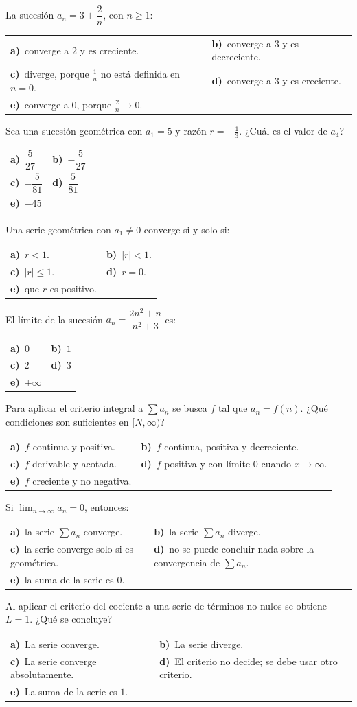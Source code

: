 \documentclass[11pt,letterpaper]{article}
\makeatletter
\newcommand{\opciones}[5]{%
  \par\vspace{2pt}%
  \noindent
  \begin{tabularx}{\linewidth}{@{}>{\raggedright\arraybackslash}X@{\hspace{14pt}}>{\raggedright\arraybackslash}X@{}}
    \textbf{a)}~#1 & \textbf{b)}~#2\\[3pt]
    \textbf{c)}~#3 & \textbf{d)}~#4\\[3pt]
    \textbf{e)}~#5 & \null
  \end{tabularx}\par\vspace{-2pt}}
\makeatother
\begin{document}
\begin{preguntas}
\item La sucesión $a_n=3+\dfrac{2}{n}$, con $n\ge 1$:
  \opciones{converge a $2$ y es creciente.}
           {converge a $3$ y es decreciente.}
           {diverge, porque $\frac{1}{n}$ no está definida en $n=0$.}
           {converge a $3$ y es creciente.}
           {converge a $0$, porque $\frac{2}{n}\to 0$.}

\item Sea una sucesión geométrica con $a_1=5$ y razón $r=-\frac{1}{3}$. ¿Cuál es el valor de $a_4$?
  \opciones{$\dfrac{5}{27}$}
           {$-\dfrac{5}{27}$}
           {$-\dfrac{5}{81}$}
           {$\dfrac{5}{81}$}
           {$-45$}

\item Una serie geométrica con $a_1\ne 0$ converge si y solo si:
  \opciones{$r<1$.}
           {$|r|<1$.}
           {$|r|\le 1$.}
           {$r=0$.}
           {que $r$ es positivo.}

\item El límite de la sucesión $a_n=\dfrac{2n^2+n}{n^2+3}$ es:
  \opciones{$0$}
           {$1$}
           {$2$}
           {$3$}
           {$+\infty$}

\newpage
{}
\item Para aplicar el criterio integral a $\sum a_n$ se busca $f$ tal que $a_n=f(n)$. ¿Qué condiciones son suficientes en $[N,\infty)$?
  \opciones{$f$ continua y positiva.}
           {$f$ continua, positiva y decreciente.}
           {$f$ derivable y acotada.}
           {$f$ positiva y con límite $0$ cuando $x\to\infty$.}
           {$f$ creciente y no negativa.}

\item Si $\lim_{n\to\infty} a_n=0$, entonces:
  \opciones{la serie $\sum a_n$ converge.}
           {la serie $\sum a_n$ diverge.}
           {la serie converge solo si es geométrica.}
           {no se puede concluir nada sobre la convergencia de $\sum a_n$.}
           {la suma de la serie es $0$.}

\item Al aplicar el criterio del cociente a una serie de términos no nulos se obtiene $L=1$. ¿Qué se concluye?
  \opciones{La serie converge.}
           {La serie diverge.}
           {La serie converge absolutamente.}
           {El criterio no decide; se debe usar otro criterio.}
           {La suma de la serie es $1$.}


\end{preguntas}
\end{document}
